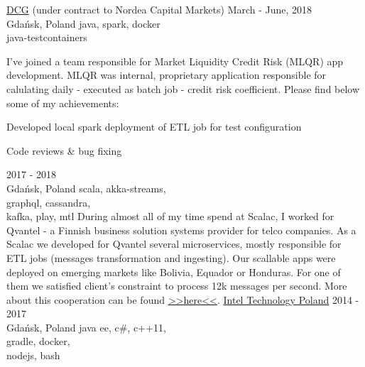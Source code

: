 \documentclass[a4paper,11pt]{cv4tw}%
\begin{document}
      {\href{https://diversecg.pl/}{DCG} (under contract to Nordea Capital Markets)}
      {March - June, 2018\\Gdańsk, Poland}
      {java, spark, docker\\java-testcontainers}
      {I've joined a team responsible for Market Liquidity Credit Risk (MLQR) app development.
        MLQR was internal, proprietary application responsible for calulating daily - executed as batch job - credit risk coefficient.
        Please find below some of my achievements:
        \begin{missions}
        \item Developed local spark deployment of ETL job for test configuration
        \item Code reviews \& bug fixing
        \end{missions}
      }
      {2017 - 2018\\Gdańsk, Poland}
      {scala, akka-streams,\\graphql, cassandra,\\kafka, play, mtl}
      {During almost all of my time spend at Scalac, I worked for Qvantel - a Finnish business solution systems provider for telco companies.
        As a Scalac we developed for Qvantel several microservices, mostly responsible for ETL jobs (messages transformation and ingesting).
        Our scallable apps were deployed on emerging markets like Bolivia, Equador or Honduras. For one of them we satisfied client's constraint
        to process \approx12k messages per second. More about this cooperation can be found
        \href{http://media.licdn.com/embeds/media.html?src=https\%3A\%2F\%2Fissuu.com\%2Foutlookpublishing\%2Fdocs\%2Fqvantel\&amp;url=https\%3A\%2F\%2Fissuu.com\%2Foutlookpublishing\%2Fdocs\%2Fqvantel\&amp;type=text\%2Fhtml\&amp;schema=issuu}{>>here<<}.
      }
      {\href{https://www.intel.com/content/www/us/en/jobs/locations/poland.html}
        {Intel Technology Poland}}
      {2014 - 2017\\Gdańsk, Poland}
      {java ee, c\#, c++11,\\gradle, docker,\\nodejs, bash}
\end{document}
